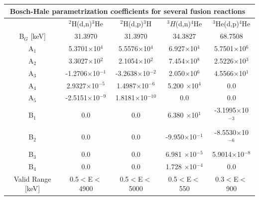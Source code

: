 \noindent
\begin{table}[h!]\small
  \noindent
  \centering
  \begin{tabular}{c c c c c}
    \multicolumn{5}{c}{Bosch-Hale parametrization coefficients for several fusion reactions~\cite{bosch}}\\
    \hline
    \T\B& $^2$H(d,n)$^3$He & $^2$H(d,p)$^3$H & $^3H$(d,n)$^4$He & $^3$He(d,p)$^4$He\\
    \hline\hline
    B$_G$ [keV]\T\B& 31.3970 & 31.3970 & 34.3827 & 68.7508 \\
    \hline
    A$_1$\T& 5.3701$\times$10$^4$        & 5.5576$\times$10$^4$      & 6.927$\times$10$^4$      & 5.7501$\times$10$^6$ \\ 
    A$_2$    & 3.3027$\times$10$^2$      & 2.1054$\times$10$^2$      & 7.454$\times$10$^8$      & 2.5226$\times$10$^3$ \\
    A$_3$    & -1.2706$\times$10$^{-1}$  & -3.2638$\times$10$^{-2}$  & 2.050$\times$10$^6$      & 4.5566$\times$10$^1$ \\
    A$_4$    & 2.9327$\times$10$^{-5}$   & 1.4987$\times$10$^{-6}$   & 5.200 $\times$10$^4$     & 0.0 \\
    A$_5$  \B& -2.5151$\times$10$^{-9}$  & 1.8181$\times$10$^{-10}$  & 0.0                      & 0.0 \\
    \hline
    B$_1$\T& 0.0                         & 0.0                       & 6.380 $\times$10$^1$     & -3.1995$\times$10$^{-3}$ \\
    B$_2$    & 0.0                       & 0.0                       & -9.950$\times$10$^{-1}$  & -8.5530$\times$10$^{-6}$ \\
    B$_3$    & 0.0                       & 0.0                       & 6.981 $\times$10$^{-5}$  & 5.9014$\times$10$^{-8}$ \\
    B$_4$\B & 0.0                        & 0.0                       & 1.728 $\times$10$^{-4}$  & 0.0\\
    \hline
    Valid Range [keV] \T\B& 0.5$<$E$<$4900 & 0.5$<$E$<$5000 & 0.5$<$E$<$550 & 0.3$<$E$<$900 \\
    \hline
  \end{tabular}
  \label{table:xsParam}
\end{table}

